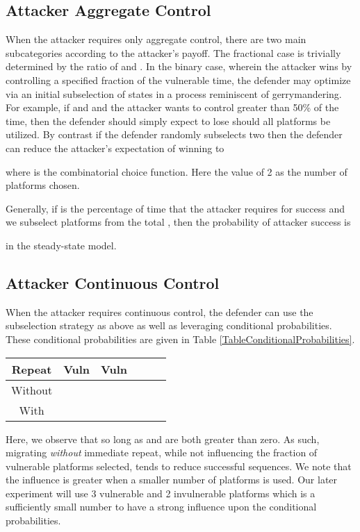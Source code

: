 \documentclass{acm_proc_article-sp}
\providecommand{\tabularnewline}{\\}
\begin{document}
\subsection{Attacker Aggregate Control}

When the attacker requires only aggregate control, there are two main subcategories according to the
attacker's payoff.  The fractional case is trivially determined by the ratio of  and . In the binary case, wherein
the attacker wins by controlling a specified fraction of the vulnerable time, the defender may optimize via an initial
subselection of states in a process reminiscent of gerrymandering. For example, if  and  and the attacker wants
to control greater than 50\% of the time, then the defender should simply expect to lose should all platforms be
utilized. By contrast if the defender randomly subselects two then the defender can reduce the attacker's expectation of
winning to

where  is the combinatorial choice function. Here the value of 2 as the number of
platforms chosen.

Generally, if  is the percentage of time that the attacker requires for success and we subselect  platforms from the total ,
then the probability of attacker success is

in the steady-state model.


\subsection{Attacker Continuous Control}

When the attacker requires continuous control, the defender can use the subselection strategy as above as well as
leveraging conditional probabilities. These conditional probabilities are given in Table
\ref{TableConditionalProbabilities}.

\begin{table*}[t]
\centering{}\begin{tabular}{|c|c|c|c|c|c|}
\hline 
Repeat & {\footnotesize Vuln} & {\footnotesize Vuln} & {\footnotesize } & {\footnotesize } & {\footnotesize }\tabularnewline
\hline 
\hline 
Without &  &  &  &  & \tabularnewline
\hline 
With &  &  &  &  & \tabularnewline
\hline 
\end{tabular}\caption{Conditional Probabilities}
\label{TableConditionalProbabilities}
\end{table*}
Here, we observe that  so long as
 and  are both greater than zero. As such, migrating \emph{without} immediate
repeat, while not influencing the fraction of vulnerable platforms
selected, tends to reduce successful sequences. We note that the influence is
greater when a smaller number of platforms is used. Our later experiment will
use 3 vulnerable and 2 invulnerable platforms which is a sufficiently
small number to have a strong influence upon the conditional probabilities.
\end{document}
